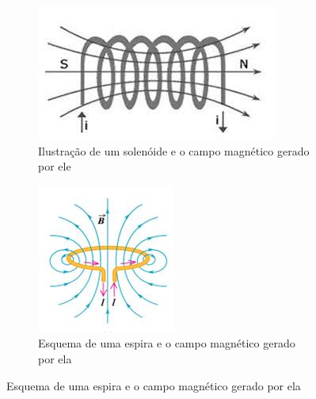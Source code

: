\documentclass[12pt]{extarticle}
\newcommand{\<}{\langle}
\renewcommand{\>}{\rangle}
\theoremstyle{definition}
\begin{document}
\begin{figure}[H]
     \hfill
     \begin{subfigure}[b]{0.3\textwidth}
         \centering
         \includegraphics[width=\textwidth]{solenoide.jpg}
         \caption{Ilustração de um solenóide e o campo magnético gerado por ele}
         \label{fig:solenoide}
     \end{subfigure}
     \hfill
     \begin{subfigure}[b]{0.3\textwidth}
         \centering
         \includegraphics[width=\textwidth]{espira.jpg}
         \caption{Esquema de uma espira e o campo magnético gerado por ela}
         \label{fig:espira}
     \end{subfigure}
\end{figure}
\end{document}
